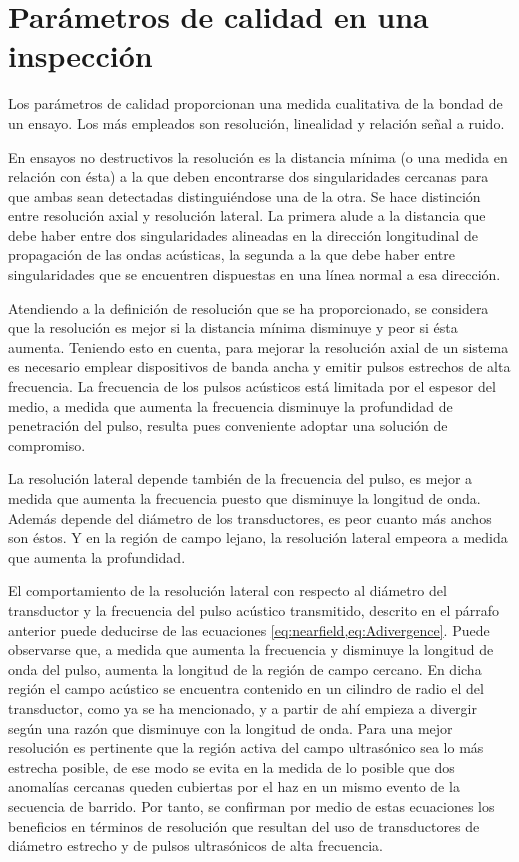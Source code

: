 \section{Parámetros de calidad en una inspección}\label{sec:quality}

Los parámetros de calidad proporcionan una medida cualitativa de la bondad
de un ensayo. Los más empleados son resolución, linealidad y relación señal
a ruido.

En ensayos no destructivos la resolución es la distancia mínima (o una
medida en relación con ésta) a la que deben encontrarse dos singularidades
cercanas para que ambas sean detectadas distinguiéndose una de la otra. Se
hace distinción entre resolución axial y resolución lateral. La primera
alude a la distancia que debe haber entre dos singularidades alineadas en
la dirección longitudinal de propagación de las ondas acústicas, la segunda
a la que debe haber entre singularidades que se encuentren dispuestas en
una línea normal a esa dirección.

Atendiendo a la definición de resolución que se ha proporcionado, se
considera que la resolución es mejor si la distancia mínima disminuye y
peor si ésta aumenta. Teniendo esto en cuenta, para mejorar la resolución
axial de un sistema es necesario emplear dispositivos de banda ancha y
emitir pulsos estrechos de alta frecuencia. La frecuencia de los pulsos
acústicos está limitada por el espesor del medio, a medida que aumenta la
frecuencia disminuye la profundidad de penetración del pulso, resulta pues
conveniente adoptar una solución de compromiso.

La resolución lateral depende también de la frecuencia del pulso, es mejor
a medida que aumenta la frecuencia puesto que disminuye la longitud de
onda. Además depende del diámetro de los transductores, es peor cuanto más
anchos son éstos. Y en la región de campo lejano, la resolución lateral
empeora a medida que aumenta la profundidad.

El comportamiento de la resolución lateral con respecto al diámetro del
transductor y la frecuencia del pulso acústico transmitido, descrito en el
párrafo anterior puede deducirse de las ecuaciones
\cref{eq:nearfield,eq:Adivergence}. Puede observarse que, a medida que
aumenta la frecuencia y disminuye la longitud de onda del pulso, aumenta la
longitud de la región de campo cercano. En dicha región el campo acústico
se encuentra contenido en un cilindro de radio el del transductor, como ya
se ha mencionado, y a partir de ahí empieza a divergir según una razón que
disminuye con la longitud de onda. Para una mejor resolución es pertinente
que la región activa del campo ultrasónico sea lo más estrecha posible, de
ese modo se evita en la medida de lo posible que dos anomalías cercanas
queden cubiertas por el haz en un mismo evento de la secuencia de barrido.
Por tanto, se confirman por medio de estas ecuaciones los beneficios en
términos de resolución que resultan del uso de transductores de diámetro
estrecho y de pulsos ultrasónicos de alta frecuencia.

